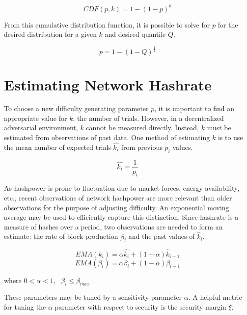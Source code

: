\documentclass[]{article}
\begin{document}
\begin{equation}
CDF(p, k) = 1 - (1 - p)^k
\end{equation}

\pagebreak
From this cumulative distribution function, it is possible to solve for $p$ for the desired distribution for a given $k$ and desired quantile $Q$.  

\begin{equation}
p = 1 - (1 - Q)^\frac{1}{k}
\end{equation}

\section{Estimating Network Hashrate}
To choose a new difficulty generating parameter $p$, it is important to find an appropriate value for $k$, the number of trials.  However, in a decentralized adversarial environment, $k$ cannot be measured directly.  Instead, $k$ must be estimated from observations of past data.  One method of estimating $k$ is to use the mean number of expected trials $\hat{k_i} $ from previous $p_i$ values.  
 
\begin{equation}
\hat{k_{i}} = \frac{1}{p_{i}}
\end{equation}

As hashpower is prone to fluctuation due to market forces, energy availability, etc., recent observations of network hashpower are more relevant than older observations for the purpose of adjusting difficulty.  An exponential moving average may be used to efficiently capture this distinction.  Since hashrate is a measure of hashes over a period, two observations are needed to form an estimate: the rate of block production $\beta_i$ and the past values of $\hat{k}_i$.

\begin{equation}
EMA(k_{i}) = \alpha \hat{k_{i}} + (1 - \alpha) \hat{k}_{i - 1}
\end{equation} 
\begin{equation}
EMA(\beta_{i}) = \alpha \beta_{i} + (1 - \alpha) \beta_{i - 1} 
\end{equation}
\centerline{$\text{where } 0 < \alpha < 1, \text{ } \beta_{i} \leq \beta_{max}$}
\newline

These parameters may be tuned by a sensitivity parameter $\alpha$.  A helpful metric for tuning the $\alpha$ parameter with respect to security is the security margin $\xi$. 
\end{document}
